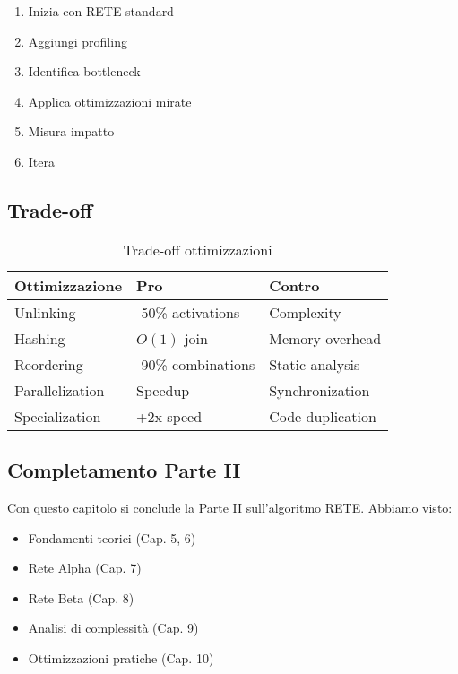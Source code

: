 \begin{successbox}
\begin{enumerate}
\item Inizia con RETE standard
\item Aggiungi profiling
\item Identifica bottleneck
\item Applica ottimizzazioni mirate
\item Misura impatto
\item Itera
\end{enumerate}
\end{successbox}

\subsection{Trade-off}

\begin{table}[h]
\centering
\begin{tabular}{@{}lll@{}}
\toprule
\textbf{Ottimizzazione} & \textbf{Pro} & \textbf{Contro} \\
\midrule
Unlinking & -50\% activations & Complexity \\
Hashing & $O(1)$ join & Memory overhead \\
Reordering & -90\% combinations & Static analysis \\
Parallelization & Speedup & Synchronization \\
Specialization & +2x speed & Code duplication \\
\bottomrule
\end{tabular}
\caption{Trade-off ottimizzazioni}
\end{table}

\subsection{Completamento Parte II}

Con questo capitolo si conclude la Parte II sull'algoritmo RETE. Abbiamo visto:
\begin{itemize}
\item Fondamenti teorici (Cap. 5, 6)
\item Rete Alpha (Cap. 7)
\item Rete Beta (Cap. 8)
\item Analisi di complessità (Cap. 9)
\item Ottimizzazioni pratiche (Cap. 10)
\end{itemize}

